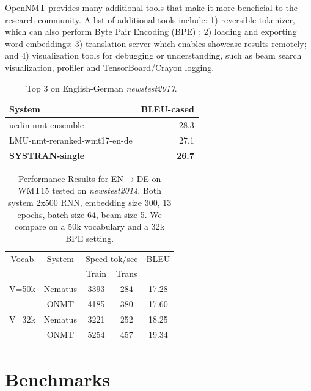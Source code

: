 \documentclass[]{article}
\begin{document}
OpenNMT provides many additional tools that make it more beneficial to the research community. A list of additional tools include: 1) reversible tokenizer, which can also perform Byte Pair Encoding (BPE) \citep{DBLP:journals/corr/SennrichHB15}; 2) loading and exporting word embeddings; 3) translation server which enables showcase results remotely; and 4) visualization tools for debugging or understanding, such as beam search visualization, profiler and TensorBoard/Crayon logging.


\begin{table}
\centering
          \begin{tabular}{l r}
          \toprule
            { System} & { BLEU-cased} \\
            \midrule
            uedin-nmt-ensemble & 28.3 \\
            LMU-nmt-reranked-wmt17-en-de & 27.1 \\
            {\bf SYSTRAN-single} & {\bf 26.7} \\
            \bottomrule
          \end{tabular}
          \caption{\label{tab:wmt}Top 3 on English-German \emph{newstest2017}.}
\end{table}



\begin{table}
  \centering
  \begin{tabular}{ccccc}
    \toprule
    Vocab & System & \multicolumn{2}{c}{Speed tok/sec}  & BLEU\\
     &  & Train  & Trans  &  \\
    \midrule
 V=50k & Nematus  & 3393 & 284 & 17.28 \\
     & ONMT  &4185 & 380 & 17.60 \\ 
    \midrule 
  V=32k & Nematus & 3221& 252 & 18.25 \\
    & ONMT &5254 & 457 & 19.34\\ 
    \bottomrule
  \end{tabular}

  \caption{ \small \label{tab:res} Performance Results for EN$\rightarrow$DE on WMT15 tested on \textit{newstest2014}. Both system 2x500 RNN, embedding size 300, 13 epochs, batch size 64, beam size 5. We compare on a 50k vocabulary and a 32k BPE setting.}
\end{table}

\section{Benchmarks}
\end{document}
